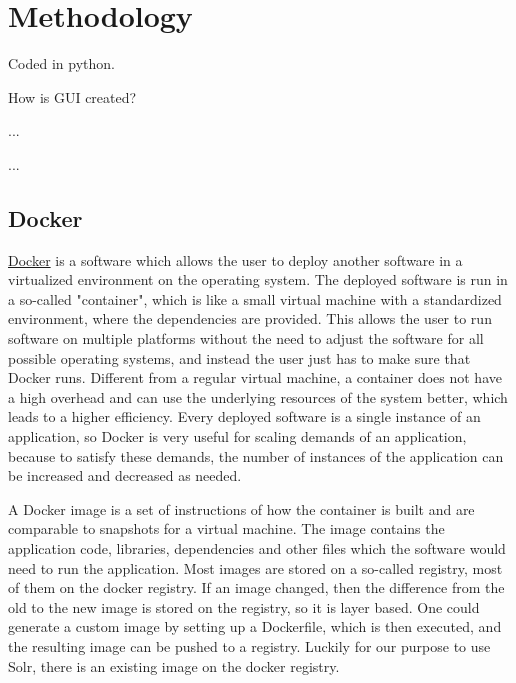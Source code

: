 \documentclass[a4paper,12pt]{article}
\begin{document}
\section{Methodology} %
Coded in python.

How is GUI created?

...

...


\subsection{Docker}
\label{sec:docker}
\href{https://www.docker.com/}{Docker}\cite{Docker} is a software which allows the user to deploy another software in a virtualized environment on the operating system. 
The deployed software is run in a so-called "container", which is like a small virtual machine with a standardized environment, where the dependencies are provided. 
This allows the user to run software on multiple platforms without the need to adjust  the software for all possible operating systems, and instead the user just has to make sure that Docker runs. 
Different from a regular virtual machine, a container does not have a high overhead and can use the underlying resources of the system better, which leads to a higher efficiency. 
Every deployed software is a single instance of an application, so Docker is very useful for scaling demands of an application, because to satisfy these demands, the number of instances of the application can be increased and decreased as needed.


A Docker image is a set of instructions of how the container is built and are comparable to snapshots for a virtual machine. 
The image contains the application code, libraries, dependencies and other files which the software would need to run the application. Most images are stored on a so-called registry, most of them on the docker registry. 
If an image changed, then the difference from the old to the new image is stored on the registry, so it is layer based. 
One could generate a custom image by setting up a Dockerfile, which is then executed, and the resulting image can be pushed to a registry. Luckily for our purpose to use Solr, there is an existing image on the docker registry. 
\end{document}
